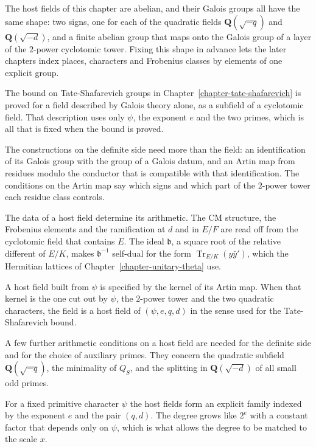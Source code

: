 The host fields of this chapter are abelian, and their Galois groups all have the same shape: two
signs, one for each of the quadratic fields $\mathbf Q(\sqrt{-q})$ and $\mathbf Q(\sqrt{-d})$, and
a finite abelian group that maps onto the Galois group of a layer of the $2$-power cyclotomic tower.
Fixing this shape in advance lets the later chapters index places, characters and Frobenius classes
by elements of one explicit group.

The bound on Tate-Shafarevich groups in Chapter~\ref{chapter-tate-shafarevich} is proved for a
field described by Galois theory alone, as a subfield of a cyclotomic field. That description uses
only $\psi$, the exponent $e$ and the two primes, which is all that is fixed when the bound is
proved.

The constructions on the definite side need more than the field: an identification of its Galois
group with the group of a Galois datum, and an Artin map from residues modulo the conductor that is
compatible with that identification. The conditions on the Artin map say which signs and which
part of the $2$-power tower each residue class controls.

The data of a host field determine its arithmetic. The CM structure, the Frobenius elements and the
ramification at $d$ and in $E/F$ are read off from the cyclotomic field that contains $E$. The
ideal $\mathfrak b$, a square root of the relative different of $E/K$, makes $\mathfrak b^{-1}$
self-dual for the form $\operatorname{Tr}_{E/K}(y\bar y')$, which the Hermitian lattices of
Chapter~\ref{chapter-unitary-theta} use.

A host field built from $\psi$ is specified by the kernel of its Artin map. When that kernel is the
one cut out by $\psi$, the $2$-power tower and the two quadratic characters, the field is a host
field of $(\psi,e,q,d)$ in the sense used for the Tate-Shafarevich bound.

A few further arithmetic conditions on a host field are needed for the definite side and for the
choice of auxiliary primes. They concern the quadratic subfield $\mathbf Q(\sqrt{-q})$, the
minimality of $Q_S$, and the splitting in $\mathbf Q(\sqrt{-d})$ of all small odd primes.

For a fixed primitive character $\psi$ the host fields form an explicit family indexed by the
exponent $e$ and the pair $(q,d)$. The degree grows like $2^e$ with a constant factor that depends
only on $\psi$, which is what allows the degree to be matched to the scale $x$.


